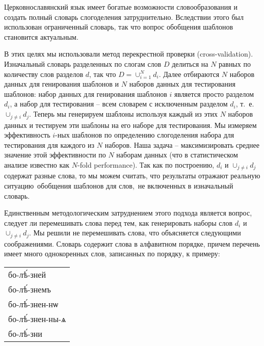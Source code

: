 \documentclass[12pt,a4paper,oneside]{extarticle}
\begin{document}
Церковнославянский язык имеет богатые возможности словообразования и создать полный словарь слогоделения затруднительно. 
Вследствии этого был использован ограниченный словарь, так что вопрос обобщения шаблонов становится актуальным.

В этих целях мы использовали метод перекрестной проверки (\textenglish{cross-validation}). Изначальный словарь разделенных по слогам слов 
$D$ делиться на $N$ равных по количеству слов разделов $d$, так что $D = \cup_{i = 1}^{N} d_i$. Далее отбираются $N$ наборов данных для 
генирования шаблонов и $N$ наборов данных для тестирования шаблонов: набор данных для генирования шаблонов $i$ является просто разделом 
$d_i$, а набор для тестирования -- всем словарем с исключенным разделом $d_i$, т.~е. $\cup_{j \neq i} d_j$. Теперь мы генерируем шаблоны 
используя каждый из этих $N$ наборов данных и тестируем эти шаблоны на его наборе для тестирования. Мы измеряем эффективность  $i$-ных 
шаблонов по определению слогоделения набора для тестирования для каждого из $N$ наборов. Наша задача -- максимизировать среднее значение 
этой эффективности по $N$ наборам данных (что в статистическом анализе известно как \textenglish{$N$-fold performance}). Так как по 
построению, $d_i$ и $\cup_{j \neq i} d_j$ содержат разные слова, то мы можем считать, что результаты отражают реальную ситуацию обобщения 
шаблонов для слов, не включенных в изначальный словарь. 

Единственным методологическим затруднением этого подхода является вопрос, следует ли перемешивать слова перед тем, как генерировать наборы 
слов $d_i$ и $\cup_{j \neq i} d_j$. Мы решили не перемешивать слова, что объясняется следующими соображениями. Словарь содержит слова в 
алфавитном порядке, причем перечень имеет много однокоренных слов, записанных по порядку, к примеру:

\begin{center}
\begin{churchslavonic}
\begin{tabular}{l}
бо-лѣ́-зней \\
бо-лѣ́-знемъ \\
бо-лѣ́-знен-нѡ \\
бо-лѣ́-знен-ны-ѧ \\
бо-лѣ́-зни \\
\end{tabular}
\end{churchslavonic}
\end{center}
\end{document}
